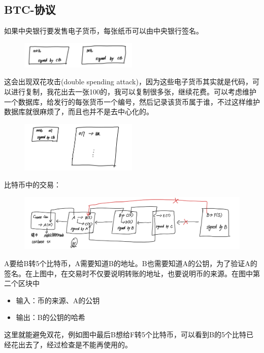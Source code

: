 \documentclass[10pt]{ctexart}
\begin{document}
\subsection{BTC-协议}
如果中央银行要发售电子货币，每张纸币可以由中央银行签名。
\begin{figure}[H]
    \centering
    \includegraphics[width=0.5\textwidth]{courses/区块链技术与应用/lecture4/img1.png} 
\end{figure}
这会出现双花攻击(double spending attack)，因为这些电子货币其实就是代码，可以进行复制，我花出去一张100的，我可以复制很多张，继续花费。可以考虑维护一个数据库，给发行的每张货币一个编号，然后记录该货币属于谁，不过这样维护数据库就很麻烦了，而且也并不是去中心化的。
\begin{figure}[H]
    \centering
    \includegraphics[width=0.5\textwidth]{courses/区块链技术与应用/lecture4/img2.png} 
\end{figure}
比特币中的交易：
\begin{figure}[H]
    \centering
    \includegraphics[width=1\textwidth]{courses/区块链技术与应用/lecture4/img3.png} 
\end{figure}
A要给B转5个比特币，A需要知道B的地址。B也需要知道A的公钥，为了验证A的签名。在上图中，在交易时不仅要说明转账的地址，也要说明币的来源。在图中第二个区块中
\begin{itemize}
    \item 输入：币的来源、A的公钥
    \item 输出：B的公钥的哈希
\end{itemize}
这里就能避免双花，例如图中最后B想给F转5个比特币，可以看到B的5个比特已经花出去了，经过检查是不能再使用的。
\end{document}
